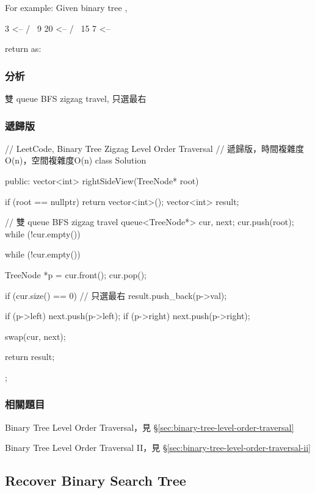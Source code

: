 For example:
Given binary tree ,
\begin{Code}
    3     <--
   / \
  9  20   <--
    /  \
   15   7 <--
\end{Code}
return as:
\begin{Code}
[3,20,7]
\end{Code}


\subsubsection{分析}
雙 queue BFS zigzag travel, 只選最右

\subsubsection{遞歸版}
\begin{Code}
// LeetCode, Binary Tree Zigzag Level Order Traversal
// 遞歸版，時間複雜度O(n)，空間複雜度O(n)
class Solution {
public:
    vector<int> rightSideView(TreeNode* root) {
        if (root == nullptr) return vector<int>();
        vector<int> result;
        
        // 雙 queue BFS zigzag travel
        queue<TreeNode*> cur, next;
        cur.push(root);
        while (!cur.empty())
        {
            while (!cur.empty())
            {
                TreeNode *p = cur.front();
                cur.pop();
                
                if (cur.size() == 0) // 只選最右
                    result.push_back(p->val);
                
                if (p->left) next.push(p->left);
                if (p->right) next.push(p->right);
            }
            swap(cur, next);
        }
        
        return result;
    }
};
\end{Code}


\subsubsection{相關題目}
\begindot
\item Binary Tree Level Order Traversal，見 \S \ref{sec:binary-tree-level-order-traversal}
\item Binary Tree Level Order Traversal II，見 \S \ref{sec:binary-tree-level-order-traversal-ii}
\myenddot

\subsection{Recover Binary Search Tree}
\label{sec:recover-binary-search-tree}


